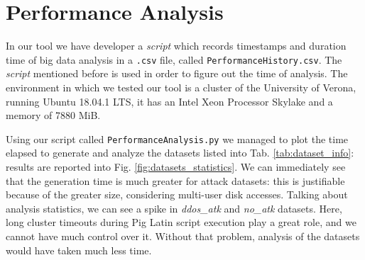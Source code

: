 \section{Performance Analysis}
In our tool we have developer a \textit{script} which records timestamps and duration time of big data analysis in a \texttt{.csv} file, called \texttt{PerformanceHistory.csv}. The \textit{script} mentioned before is used in order to figure out the time of analysis. 
The environment in which we tested our tool is a cluster of the University of Verona, running Ubuntu 18.04.1 LTS, it has an Intel Xeon Processor Skylake and a memory of 7880 MiB. 

Using our script called \texttt{PerformanceAnalysis.py} we managed to plot the time elapsed to generate and analyze the datasets listed into Tab. \ref{tab:dataset_info}: results are reported into Fig. \ref{fig:datasets_statistics}.
We can immediately see that the generation time is much greater for attack datasets: this is justifiable because of the greater size, considering multi-user disk accesses.
Talking about analysis statistics, we can see a spike in \textit{ddos\_atk} and \textit{no\_atk} datasets. Here, long cluster timeouts during Pig Latin script execution play a great role, and we cannot have much control over it. Without that problem, analysis of the datasets would have taken much less time.

